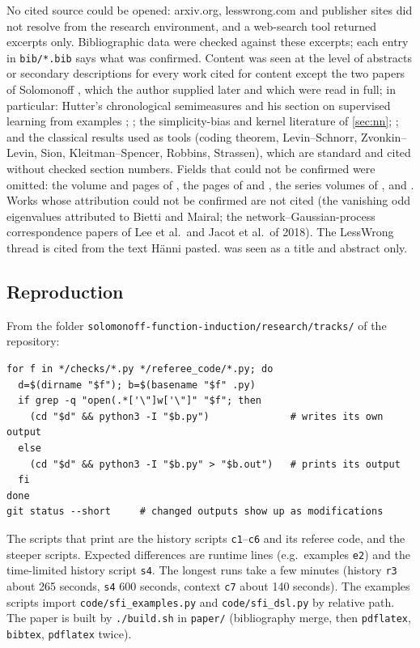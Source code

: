 No cited source could be opened: arxiv.org, lesswrong.com and publisher sites did not resolve from the research environment, and a web-search tool returned excerpts only. Bibliographic data were checked against these excerpts; each entry in \texttt{bib/*.bib} says what was confirmed. Content was seen at the level of abstracts or secondary descriptions for every work cited for content except the two papers of Solomonoff \citep{solomonoff1999two,solomonoff2008three}, which the author supplied later and which were read in full; in particular: Hutter's chronological semimeasures and his section on supervised learning from examples \citep{hutter2000theory,hutter2005universal,hutter2007aixi}; \citet{lattimore2011universal,wood2013non,lattimore2013nofree,poland2005asymptotics,leike2015bad,leike2015computability,ryabko2006pattern}; the simplicity-bias and kernel literature of \cref{sec:nn}; \citet{impagliazzo1990no}; and the classical results used as tools (coding theorem, Levin--Schnorr, Zvonkin--Levin, Sion, Kleitman--Spencer, Robbins, Strassen), which are standard and cited without checked section numbers. Fields that could not be confirmed were omitted: the volume and pages of \citet{day2011increasing}, the pages of \citet{vovk1990aggregating} and \citet{basri2019convergence}, the series volumes of \citet{orseau2013universal}, \citet{schmidhuber2002speed} and \citet{wood2013non}. Works whose attribution could not be confirmed are not cited (the vanishing odd eigenvalues attributed to Bietti and Mairal; the network--Gaussian-process correspondence papers of Lee et al.\ and Jacot et al.\ of 2018). The LessWrong thread \citep{hanni2026lesswrong} is cited from the text H\"anni pasted.  was seen as a title and abstract only.

\subsection{Reproduction}\label{app:verification:repro}

From the folder \texttt{solomonoff-function-induction/research/tracks/} of the repository:
\begin{verbatim}
for f in */checks/*.py */referee_code/*.py; do
  d=$(dirname "$f"); b=$(basename "$f" .py)
  if grep -q "open(.*['\"]w['\"]" "$f"; then
    (cd "$d" && python3 -I "$b.py")              # writes its own output
  else
    (cd "$d" && python3 -I "$b.py" > "$b.out")   # prints its output
  fi
done
git status --short     # changed outputs show up as modifications
\end{verbatim}
The scripts that print are the history scripts \texttt{c1}--\texttt{c6} and its referee code, and the steeper scripts. Expected differences are runtime lines (e.g.\ examples \texttt{e2}) and the time-limited history script \texttt{s4}. The longest runs take a few minutes (history \texttt{r3} about 265 seconds, \texttt{s4} 600 seconds, context \texttt{c7} about 140 seconds). The examples scripts import \texttt{code/sfi\_examples.py} and \texttt{code/sfi\_dsl.py} by relative path. The paper is built by \texttt{./build.sh} in \texttt{paper/} (bibliography merge, then \texttt{pdflatex}, \texttt{bibtex}, \texttt{pdflatex} twice).

